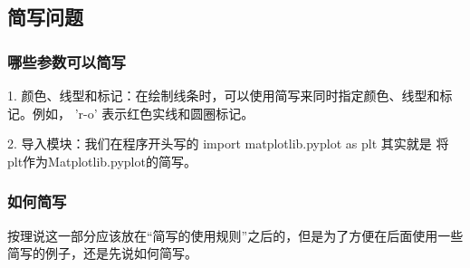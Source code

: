 \documentclass[12pt]{article}
\begin{document}
\subsection{简写问题}\label{简写问题}
\subsubsection{哪些参数可以简写}
1. 颜色、线型和标记：在绘制线条时，可以使用简写来同时指定颜色、线型和标记。例如，  'r-o'   表示红色实线和圆圈标记。

2. 导入模块：我们在程序开头写的 import matplotlib.pyplot as plt  其实就是 将plt作为Matplotlib.pyplot的简写。

\subsubsection{如何简写}
按理说这一部分应该放在“简写的使用规则”之后的，但是为了方便在后面使用一些简写的例子，还是先说如何简写。
\end{document}
